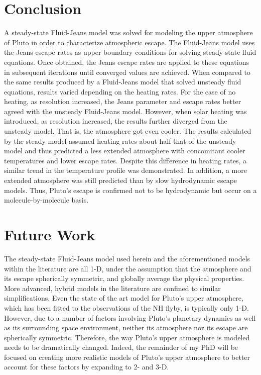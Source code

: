 \documentclass[times,12]{article}
\begin{document}
\newpage
\section*{Conclusion}
\noindent A steady-state Fluid-Jeans model was solved for modeling the upper atmosphere of Pluto in order to characterize atmospheric escape. The Fluid-Jeans model uses the Jeans escape rates as upper boundary conditions for solving steady-state fluid equations. Once obtained, the Jeans escape rates are applied to these equations in subsequent iterations until converged values are achieved. When compared to the same results produced by a Fluid-Jeans model that solved unsteady fluid equations, results varied depending on the heating rates. For the case of no heating, as resolution increased, the Jeans parameter and escape rates better agreed with the unsteady Fluid-Jeans model. However, when solar heating was introduced, as resolution increased, the results further diverged from the unsteady model. That is, the atmosphere got even cooler. The results calculated by the steady model assumed heating rates about half that of the unsteady model and thus predicted a less extended atmosphere with concomitant cooler temperatures and lower escape rates. Despite this difference in heating rates, a similar trend in the temperature profile was demonstrated. In addition, a more extended atmosphere was still predicted than by slow hydrodynamic escape models. Thus, Pluto's escape is confirmed not to be hydrodynamic but occur on a molecule-by-molecule basis.

\section*{Future Work}
\noindent The steady-state Fluid-Jeans model used herein and the aforementioned models within the literature are all 1-D, under the assumption that the atmosphere and its escape spherically symmetric, and globally average the physical properties. More advanced, hybrid models in the literature are confined to similar simplifications. Even the state of the art model for Pluto's upper atmosphere, which has been fitted to the observations of the NH flyby, is typically only 1-D. However, due to a number of factors involving Pluto's planetary dynamics as well as its surrounding space environment, neither its atmosphere nor its escape are spherically symmetric. Therefore, the way Pluto's upper atmosphere is modeled needs to be dramatically changed. Indeed, the remainder of my PhD will be focused on creating more realistic models of Pluto's upper atmosphere to better account for these factors by expanding to 2- and 3-D. 
\end{document}
